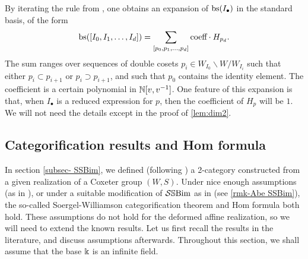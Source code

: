 By iterating the rule from \cite[Proposition 2.3.3]{WillSingular}, one obtains an expansion of $\operatorname{bs}(I_{\bullet})$ in the standard basis, of the form
\begin{equation} \label{eq:expandbs} \operatorname{bs}([I_0,I_1,\ldots,I_d]) = \sum_{[p_0,p_1,\ldots,p_d]} \textrm{coeff} \cdot H_{p_d}. \end{equation}
The sum ranges over sequences of double cosets $p_i \in W_{I_0} \backslash W / W_{I_i}$ such that either $p_i \subset p_{i+1}$ or $p_i \supset p_{i+1}$, and such that $p_0$ contains the identity element. The coefficient is a certain polynomial in $\mathbb{N}[v,v^{-1}]$. One feature of this expansion is that, when $I_{\bullet}$ is a reduced expression for $p$, then the coefficient of $H_p$ will be $1$. We will not need the details except in the proof of \cref{lem:dim2}.

\subsection{Categorification results and Hom formula}
\label{subsec-categorification}
In section \ref{subsec- SSBim}, we defined (following \cite{WillSingular}) a 2-category constructed from a given realization of a Coxeter group $(W,S)$. 
Under nice enough assumptions (as in \cite{WillSingular}), or under a suitable modification of $\mathcal{S}\mathbb{S}\text{Bim}$ as in \cite{Abe} (see \cref{rmk-Abe SSBim}), the so-called Soergel-Williamson categorification theorem and Hom formula both hold. These assumptions do not hold for the deformed affine realization, so we will need to extend the known results. Let us first recall the results in the literature, and discuss assumptions afterwards. Throughout this section, we shall assume that the base $\Bbbk$ is an infinite field.

